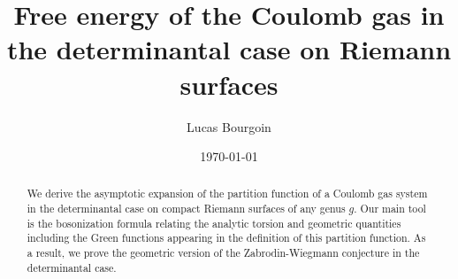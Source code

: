 \documentclass{article}
\title{Free energy of the Coulomb gas in the determinantal case on Riemann surfaces}
\author{Lucas Bourgoin }
\date{\today}
\theoremstyle{definition}
\theoremstyle{remark}
\begin{document}
\maketitle
\vspace{-2.65em}
\begin{abstract}
    We derive the asymptotic expansion of the partition function of a Coulomb gas system in the determinantal case on compact Riemann surfaces of any genus $g$. Our main tool is the bosonization formula relating the analytic torsion and geometric quantities including the Green functions appearing in the definition of this partition function. As a result, we prove the geometric version of the Zabrodin-Wiegmann conjecture in the determinantal case.
\end{abstract}
\tableofcontents
\end{document}
